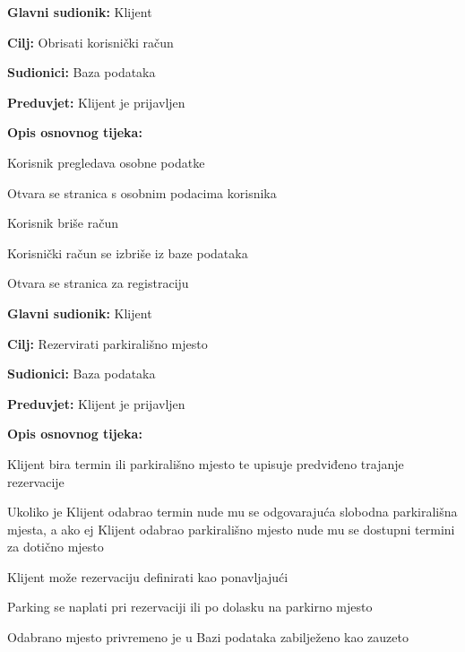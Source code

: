                         \noindent {}
					\begin{packed_item}
	
						\item \textbf{Glavni sudionik: }Klijent
						\item  \textbf{Cilj:} Obrisati korisnički račun
						\item  \textbf{Sudionici:} Baza podataka
						\item  \textbf{Preduvjet:} Klijent je prijavljen
						\item  \textbf{Opis osnovnog tijeka:}
						
						\item[] \begin{packed_enum}
	
							\item Korisnik pregledava osobne podatke
							\item Otvara se stranica s osobnim podacima korisnika
							\item Korisnik briše račun
                                \item Korisnički račun se izbriše iz baze podataka
                                \item Otvara se stranica za registraciju
							
						\end{packed_enum}

                            

                        \noindent {}
					\begin{packed_item}
	
						\item \textbf{Glavni sudionik: }Klijent
						\item  \textbf{Cilj:} Rezervirati parkirališno mjesto
						\item  \textbf{Sudionici:} Baza podataka
						\item  \textbf{Preduvjet:} Klijent je prijavljen
						\item  \textbf{Opis osnovnog tijeka:}
						
						\item[] \begin{packed_enum}
	
							\item Klijent bira termin ili parkirališno mjesto te upisuje predviđeno trajanje rezervacije
							\item Ukoliko je Klijent odabrao termin nude mu se odgovarajuća slobodna parkirališna mjesta, a ako ej Klijent odabrao parkirališno mjesto nude mu se dostupni termini za dotično mjesto
							\item Klijent može rezervaciju definirati kao ponavljajući
                                \item Parking se naplati pri rezervaciji ili po dolasku na parkirno mjesto
                                \item Odabrano mjesto privremeno je u Bazi podataka zabilježeno kao zauzeto
							

\end{packed_enum}
\end{packed_item}
\end{packed_item}
